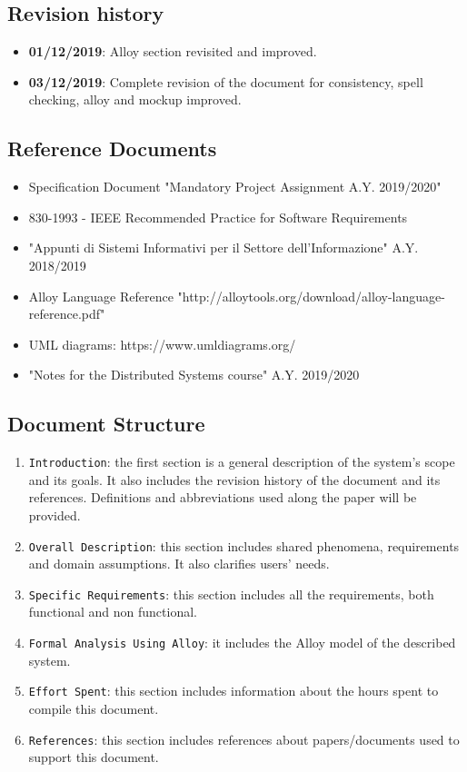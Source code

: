 \documentclass[12pt,a4paper]{article}
\begin{document}
\subsection{Revision history} 
\begin{itemize}
\item \textbf{01/12/2019}: Alloy section revisited and improved.
\item \textbf{03/12/2019}: Complete revision of the document for consistency, spell checking, alloy and mockup improved.
\end{itemize}
\subsection{Reference Documents} 
\begin{itemize}
				\item Specification Document "Mandatory Project Assignment A.Y. 2019/2020"
				\item 830-1993 - IEEE Recommended Practice for Software Requirements
				\item "Appunti di Sistemi Informativi per il Settore dell'Informazione" A.Y. 2018/2019
				\item Alloy Language Reference "http://alloytools.org/download/alloy-language-reference.pdf"
				\item UML diagrams: https://www.uml­diagrams.org/
				\item "Notes for the Distributed Systems course" A.Y. 2019/2020
			\end{itemize}
\subsection{Document Structure} 
\begin{enumerate}
			\item \texttt{Introduction}: the first section is a general description of the system's scope and its goals. It also includes the revision history of the document and its references. Definitions and abbreviations used along the paper will be provided.
			\item \texttt{Overall Description}: this section includes shared phenomena, requirements and domain assumptions. It also clarifies users' needs.
			\item \texttt{Specific Requirements}: this section includes all the requirements, both functional and non functional.
			\item \texttt{Formal Analysis Using Alloy}: it includes the Alloy model of the described system.
			\item \texttt{Effort Spent}: this section includes information about the hours spent to compile this document.
			\item \texttt{References}: this section includes references about papers/documents used to support this document.
		\end{enumerate}
\newpage
\end{document}
